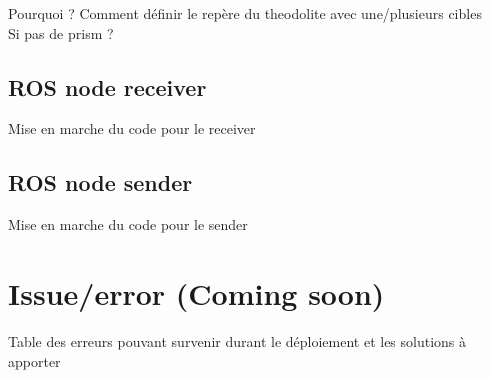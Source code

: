 \documentclass[10pt,letterpaper,oneside]{article}
\begin{document}
Pourquoi ?
Comment définir le repère du theodolite avec une/plusieurs cibles \\
Si pas de prism ? \\

\subsection{ROS node receiver}

Mise en marche du code pour le receiver

\subsection{ROS node sender}

Mise en marche du code pour le sender

\section{Issue/error (Coming soon)}
\label{sec:issue}

Table des erreurs pouvant survenir durant le déploiement et les solutions à apporter

\printbibliography
\end{document}
